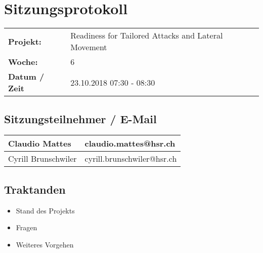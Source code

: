 \newcommand{\TITLE}{Readiness for Tailored Attacks and Lateral Movement Detection}
\newcommand{\REVIEW}{Weekly Meeting}
\newcommand{\VERSION}{0.0}





\section*{Sitzungsprotokoll}

\begin{tabular}{p{4cm} p{12cm}}
    \textbf{Projekt:} & Readiness for Tailored Attacks and Lateral Movement  \\
    \textbf{Woche:} & 6 \\
    \textbf{Datum / Zeit} & 23.10.2018 07:30 - 08:30 \\
\end{tabular}

\subsection*{Sitzungsteilnehmer / E-Mail}
\begin{table}[H]
    \centering
    \begin{tabular}{p{4cm} p{12cm}} \hline
        Claudio Mattes & claudio.mattes@hsr.ch \\ \hline
        Cyrill Brunschwiler & cyrill.brunschwiler@hsr.ch \\ \hline
    \end{tabular}
\end{table}

\vspace{1cm}

\subsection*{Traktanden}
\begin{itemize}
    \item Stand des Projekts
    \item Fragen
    \item Weiteres Vorgehen
\end{itemize}

\clearpage


